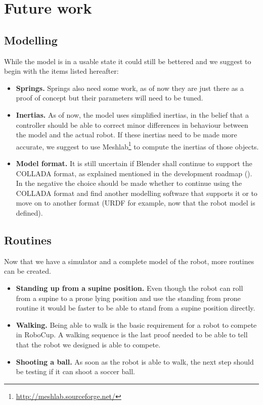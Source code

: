 \section{Future work}
\subsection{Modelling}
While the model is in a usable state it could still be bettered and we suggest to begin with the items listed hereafter:
\begin{itemize}
\item \textbf{Springs.} Springs also need some work, as of now they are just there as a proof of concept but their parameters will need to be tuned.

\item \textbf{Inertias.} As of now, the model uses simplified inertias, in the belief that a controller should be able to correct minor differences in behaviour between the model and the actual robot. If these inertias need to be made more accurate, we suggest to use Meshlab\footnote{\url{http://meshlab.sourceforge.net/}} to compute the inertias of those objects.

\item \textbf{Model format.} It is still uncertain if Blender shall continue to support the COLLADA format, as explained mentioned in the development roadmap (\cite{blender_roadmap}). In the negative the choice should be made whether to continue using the COLLADA format and find another modelling software that supports it or to move on to another format (URDF for example, now that the robot model is defined).

\end{itemize}

\subsection{Routines}
Now that we have a simulator and a complete model of the robot, more routines can be created. 
\begin{itemize}
\item \textbf{Standing up from a supine position.} Even though the robot can roll from a supine to a prone lying position and use the standing from prone routine it would be faster to be able to stand from a supine position directly.

\item \textbf{Walking.} Being able to walk is the basic requirement for a robot to compete in RoboCup. A walking sequence is the last proof needed to be able to tell that the robot we designed is able to compete.

\item \textbf{Shooting a ball.} As soon as the robot is able to walk, the next step should be testing if it can shoot a soccer ball.
\end{itemize}

